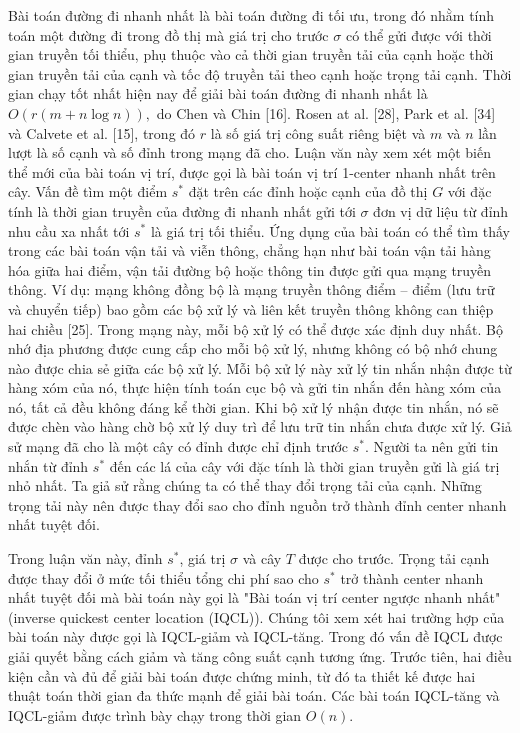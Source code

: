 \documentclass[12pt,oneside,a4paper]{bookAnh1}
\theoremstyle{plain}
\theoremstyle{nonumberplain}
\numberwithin{equation}{chapter}
\begin{document}
{Bài toán đường đi nhanh nhất là bài toán đường đi tối ưu, trong đó nhằm tính toán một đường đi trong đồ thị mà giá trị cho trước $\sigma $ có thể gửi được với thời gian truyền tối thiểu, phụ thuộc vào cả thời gian truyền tải của cạnh hoặc thời gian truyền tải của cạnh và tốc độ truyền tải theo cạnh hoặc trọng tải cạnh. Thời gian chạy tốt nhất hiện nay để giải bài toán đường đi nhanh nhất là $O\left( r\left( m+n\log n \right) \right),$ do Chen và Chin [16]. Rosen at al. [28], Park et al. [34] và Calvete et al. [15], trong đó $r$ là số giá trị công suất riêng biệt và $m$ và $n$ lần lượt là số cạnh và số đỉnh trong mạng đã cho.
Luận văn này xem xét một biến thể mới của bài toán vị trí, được gọi là bài toán vị trí 1-center nhanh nhất trên cây. Vấn đề tìm một điểm $s^*$ đặt trên các đỉnh hoặc cạnh của đồ thị $G$ với đặc tính là thời gian truyền của đường đi nhanh nhất gửi tới $\sigma $ đơn vị dữ liệu từ đỉnh nhu cầu xa nhất tới $s^*$ là giá trị tối thiểu. Ứng dụng của bài toán có thể tìm thấy trong các bài toán vận tải và viễn thông, chẳng hạn như bài toán vận tải hàng hóa giữa hai điểm, vận tải đường bộ hoặc thông tin được gửi qua mạng truyền thông. Ví dụ: mạng không đồng bộ là mạng truyền thông điểm – điểm (lưu trữ và chuyển tiếp) bao gồm các bộ xử lý và liên kết truyền thông không can thiệp hai chiều [25]. Trong mạng này, mỗi bộ xử lý có thể được xác định duy nhất. Bộ nhớ địa phương được cung cấp cho mỗi bộ xử lý, nhưng không có bộ nhớ chung nào được chia sẻ giữa các bộ xử lý. Mỗi bộ xử lý này xử lý tin nhắn nhận được từ hàng xóm của nó, thực hiện tính toán cục bộ và gửi tin nhắn đến hàng xóm của nó, tất cả đều không đáng kể thời gian. Khi bộ xử lý nhận được tin nhắn, nó sẽ được chèn vào hàng chờ bộ xử lý duy trì để lưu trữ tin nhắn chưa được xử lý. Giả sử mạng đã cho là một cây có đỉnh được chỉ định trước $s^*.$ Người ta nên gửi tin nhắn từ đỉnh $s^*$ đến các lá của cây với đặc tính là thời gian truyền gửi là giá trị nhỏ nhất. Ta giả sử rằng chúng ta có thể thay đổi trọng tải của cạnh. Những trọng tải này nên được thay đổi sao cho đỉnh nguồn trở thành đỉnh center nhanh nhất tuyệt đối.

Trong luận văn này, đỉnh $s^*$, giá trị $\sigma $ và cây $T$ được cho trước. Trọng tải cạnh được thay đổi ở mức tối thiểu tổng chi phí sao cho $s^*$ trở thành center nhanh nhất tuyệt đối mà bài toán này gọi là "Bài toán vị trí center ngược nhanh nhất" (inverse quickest center location (IQCL)). Chúng tôi xem xét hai trường hợp của bài toán này được gọi là IQCL-giảm và IQCL-tăng. Trong đó vấn đề IQCL được giải quyết bằng cách giảm và tăng công suất cạnh tương ứng. Trước tiên, hai điều kiện cần và đủ để giải bài toán được chứng minh, từ đó ta thiết kế được hai thuật toán thời gian đa thức mạnh để giải bài toán. Các bài toán IQCL-tăng và IQCL-giảm được trình bày chạy trong thời gian $O\left( n \right).$\\

}
\end{document}
